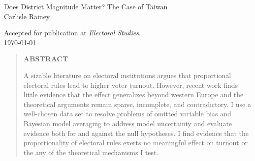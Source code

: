 \documentclass[12pt]{article}
\begin{document}
\begin{center}
{\LARGE Does District Magnitude Matter? The Case of Taiwan}\\\vspace{2mm}
\vspace{10mm}
Carlisle Rainey\\
\vspace{5mm}
\begin{footnotesize}
Accepted for publication at \textit{Electoral Studies}.\\
\vspace{3mm}
\today
\end{footnotesize}
\end{center}


\vspace{10mm}
\begin{quote}
\begin{center} \bf{ABSTRACT}\end{center}
A sizable literature on electoral institutions argues that proportional electoral rules lead to higher voter turnout. However, recent work finds little evidence that the effect generalizes beyond western Europe and the theoretical arguments remain sparse, incomplete, and contradictory. I use a well-chosen data set to resolve problems of omitted variable bias and Bayesian model averaging to address model uncertainty and evaluate evidence both for and against the null hypotheses. I find evidence that the proportionality of electoral rules exerts no meaningful effect on turnout or the any of the theoretical mechanisms I test.
\end{quote}
\clearpage
\end{document}

